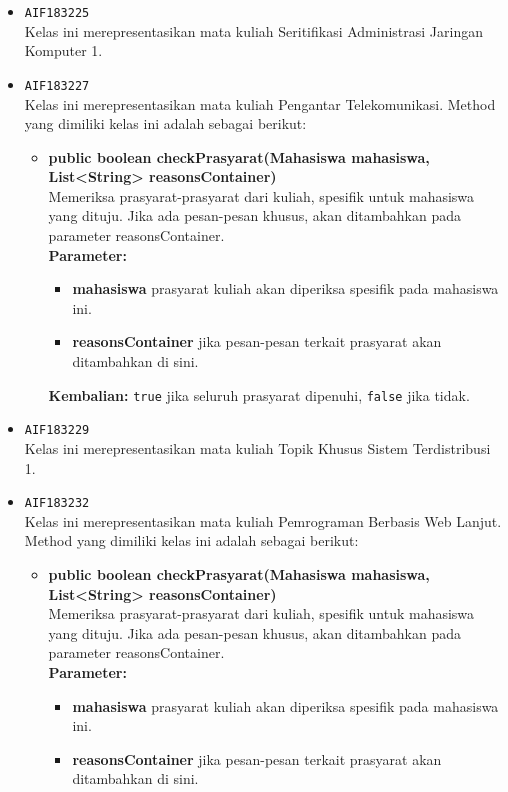 \begin{enumerate}
\begin{itemize}
\item \texttt{AIF183225} \\
Kelas ini merepresentasikan mata kuliah Seritifikasi Administrasi Jaringan Komputer 1.
\item \texttt{AIF183227} \\
Kelas ini merepresentasikan mata kuliah Pengantar Telekomunikasi. Method yang dimiliki kelas ini adalah sebagai berikut: 
\begin{itemize}
\item \textbf{public boolean checkPrasyarat(Mahasiswa mahasiswa, List<String> reasonsContainer)}\\
Memeriksa prasyarat-prasyarat dari kuliah, spesifik untuk mahasiswa yang dituju. Jika ada pesan-pesan khusus, akan ditambahkan pada parameter reasonsContainer.\\
\textbf{Parameter:}
\begin{itemize}
\item \textbf{mahasiswa} prasyarat kuliah akan diperiksa spesifik pada mahasiswa ini.
\item \textbf{reasonsContainer} jika pesan-pesan terkait prasyarat akan ditambahkan di sini.
\end{itemize}
\textbf{Kembalian:} \texttt{true} jika seluruh prasyarat dipenuhi, \texttt{false} jika tidak.
\end{itemize}
\item \texttt{AIF183229} \\
Kelas ini merepresentasikan mata kuliah Topik Khusus Sistem Terdistribusi 1.
\item \texttt{AIF183232} \\
Kelas ini merepresentasikan mata kuliah Pemrograman Berbasis Web Lanjut. Method yang dimiliki kelas ini adalah sebagai berikut: 
\begin{itemize}
\item \textbf{public boolean checkPrasyarat(Mahasiswa mahasiswa, List<String> reasonsContainer)}\\
Memeriksa prasyarat-prasyarat dari kuliah, spesifik untuk mahasiswa yang dituju. Jika ada pesan-pesan khusus, akan ditambahkan pada parameter reasonsContainer.\\
\textbf{Parameter:}
\begin{itemize}
\item \textbf{mahasiswa} prasyarat kuliah akan diperiksa spesifik pada mahasiswa ini.
\item \textbf{reasonsContainer} jika pesan-pesan terkait prasyarat akan ditambahkan di sini.
\end{itemize}

\end{itemize}
\end{itemize}
\end{enumerate}
